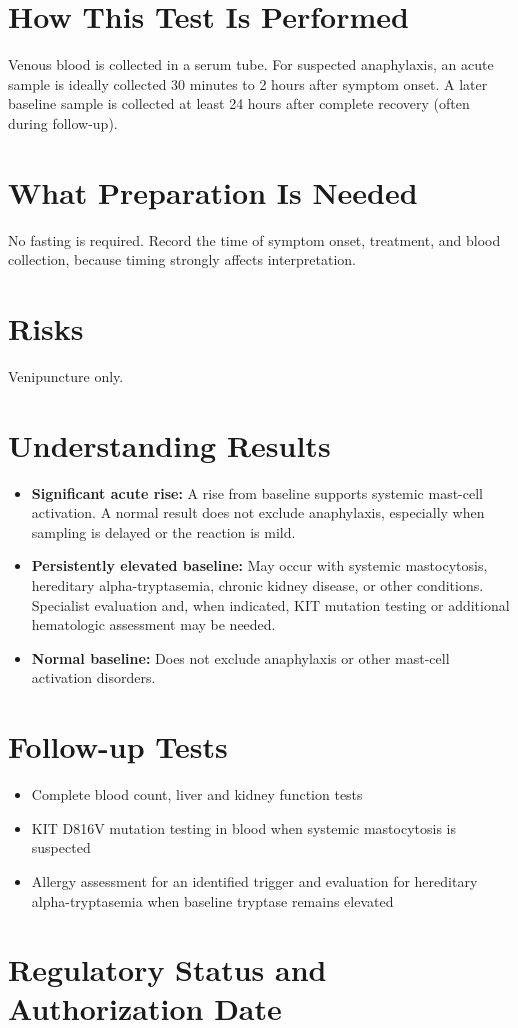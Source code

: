 \section*{How This Test Is Performed}
Venous blood is collected in a serum tube. For suspected anaphylaxis, an acute sample is ideally collected 30 minutes to 2 hours after symptom onset. A later baseline sample is collected at least 24 hours after complete recovery (often during follow-up).

\section*{What Preparation Is Needed}
No fasting is required. Record the time of symptom onset, treatment, and blood collection, because timing strongly affects interpretation.

\section*{Risks}
Venipuncture only.

\section*{Understanding Results}
\begin{itemize}
  \item \textbf{Significant acute rise:} A rise from baseline supports systemic mast-cell activation. A normal result does not exclude anaphylaxis, especially when sampling is delayed or the reaction is mild.
  \item \textbf{Persistently elevated baseline:} May occur with systemic mastocytosis, hereditary alpha-tryptasemia, chronic kidney disease, or other conditions. Specialist evaluation and, when indicated, KIT mutation testing or additional hematologic assessment may be needed.
  \item \textbf{Normal baseline:} Does not exclude anaphylaxis or other mast-cell activation disorders.
\end{itemize}

\section*{Follow-up Tests}
\begin{itemize}
  \item Complete blood count, liver and kidney function tests
  \item KIT D816V mutation testing in blood when systemic mastocytosis is suspected
  \item Allergy assessment for an identified trigger and evaluation for hereditary alpha-tryptasemia when baseline tryptase remains elevated
\end{itemize}

\clearpage
\section*{Regulatory Status and Authorization Date}

\clearpage
